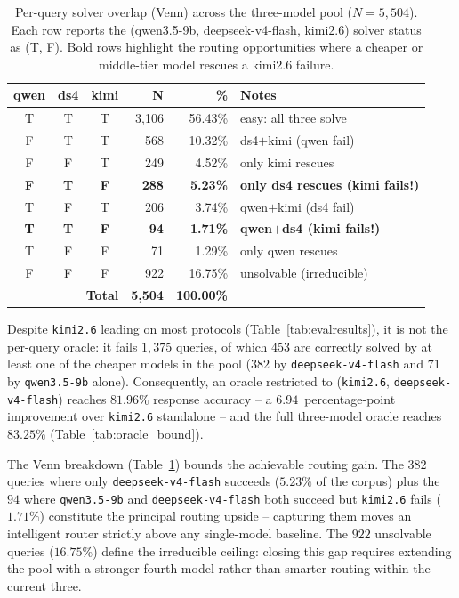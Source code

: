 \documentclass[11pt,a4paper]{article}
\begin{document}
\begin{table}[ht]
\centering
\caption{Per-query solver overlap (Venn) across the three-model pool
($N{=}5{,}504$). Each row reports the (qwen3.5-9b, deepseek-v4-flash,
kimi2.6) solver status as (T, F). Bold rows highlight the routing
opportunities where a cheaper or middle-tier model rescues a kimi2.6
failure.}
\label{tab:venn_breakdown}
\small
\begin{tabular}{c c c r r l}
\toprule
\textbf{qwen} & \textbf{ds4} & \textbf{kimi} & \textbf{N} & \textbf{\%} & \textbf{Notes} \\
\midrule
T & T & T & 3{,}106 & 56.43\% & easy: all three solve \\
F & T & T & 568   & 10.32\% & ds4$+$kimi (qwen fail) \\
F & F & T & 249   & 4.52\%  & only kimi rescues \\
\textbf{F} & \textbf{T} & \textbf{F} & \textbf{288} & \textbf{5.23\%} & \textbf{only ds4 rescues (kimi fails!)} \\
T & F & T & 206   & 3.74\%  & qwen$+$kimi (ds4 fail) \\
\textbf{T} & \textbf{T} & \textbf{F} & \textbf{94}  & \textbf{1.71\%} & \textbf{qwen$+$ds4 (kimi fails!)} \\
T & F & F & 71    & 1.29\%  & only qwen rescues \\
F & F & F & 922   & 16.75\% & unsolvable (irreducible) \\
\midrule
\multicolumn{3}{r}{\textbf{Total}} & \textbf{5{,}504} & \textbf{100.00\%} & \\
\bottomrule
\end{tabular}
\end{table}

Despite \texttt{kimi2.6} leading on most protocols
(Table~\ref{tab:evalresults}), it is not the per-query oracle: it fails
$1{,}375$ queries, of which $453$ are correctly solved by at least one of the
cheaper models in the pool ($382$ by \texttt{deepseek-v4-flash} and $71$ by
\texttt{qwen3.5-9b} alone). Consequently, an oracle restricted to
(\texttt{kimi2.6}, \texttt{deepseek-v4-flash}) reaches $81.96\%$ response
accuracy -- a $6.94$~percentage-point improvement over \texttt{kimi2.6}
standalone -- and the full three-model oracle reaches $83.25\%$
(Table~\ref{tab:oracle_bound}).

The Venn breakdown (Table~\ref{tab:venn_breakdown}) bounds the achievable
routing gain. The $382$ queries where only \texttt{deepseek-v4-flash}
succeeds ($5.23\%$ of the corpus) plus the $94$ where \texttt{qwen3.5-9b}
and \texttt{deepseek-v4-flash} both succeed but \texttt{kimi2.6} fails
($1.71\%$) constitute the principal routing upside -- capturing them moves
an intelligent router strictly above any single-model baseline. The $922$
unsolvable queries ($16.75\%$) define the irreducible ceiling: closing this
gap requires extending the pool with a stronger fourth model rather than
smarter routing within the current three.
\end{document}
